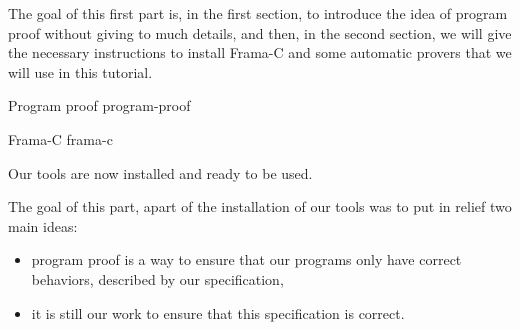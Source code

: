 The goal of this first part is, in the first section, to introduce the
idea of program proof without giving to much details, and then, in the
second section, we will give the necessary instructions to install
Frama-C and some automatic provers that we will use in this tutorial.



\begin{levelTwo}
  {Program proof}
  {program-proof}
\end{levelTwo}

\begin{levelTwo}
  {Frama-C}
  {frama-c}
\end{levelTwo}



\horizontalLine



Our tools are now installed and ready to be used.



The goal of this part, apart of the installation of our tools was to put
in relief two main ideas:


\begin{itemize}
\item program proof is a way to ensure that our programs only have correct
  behaviors, described by our specification,
\item it is still our work to ensure that this specification is correct.
\end{itemize}
